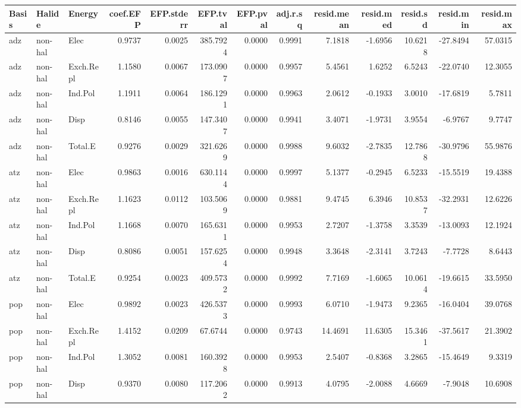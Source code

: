 \begin{table}[ht]
\centering
\scriptsize
\begin{tabular}{lllrrrrrrrrrr}
  \hline
Basis & Halide & Energy & coef.EFP & EFP.stderr & EFP.tval & EFP.pval & adj.r.sq & resid.mean & resid.med & resid.sd & resid.min & resid.max \\ 
  \hline
adz & non-hal & Elec & 0.9737 & 0.0025 & 385.7924 & 0.0000 & 0.9991 & 7.1818 & -1.6956 & 10.6218 & -27.8494 & 57.0315 \\ 
  adz & non-hal & Exch.Repl & 1.1580 & 0.0067 & 173.0907 & 0.0000 & 0.9957 & 5.4561 & 1.6252 & 6.5243 & -22.0740 & 12.3055 \\ 
  adz & non-hal & Ind.Pol & 1.1911 & 0.0064 & 186.1291 & 0.0000 & 0.9963 & 2.0612 & -0.1933 & 3.0010 & -17.6819 & 5.7811 \\ 
  adz & non-hal & Disp & 0.8146 & 0.0055 & 147.3407 & 0.0000 & 0.9941 & 3.4071 & -1.9731 & 3.9554 & -6.9767 & 9.7747 \\ 
  adz & non-hal & Total.E & 0.9276 & 0.0029 & 321.6269 & 0.0000 & 0.9988 & 9.6032 & -2.7835 & 12.7868 & -30.9796 & 55.9876 \\ 
  atz & non-hal & Elec & 0.9863 & 0.0016 & 630.1144 & 0.0000 & 0.9997 & 5.1377 & -0.2945 & 6.5233 & -15.5519 & 19.4388 \\ 
  atz & non-hal & Exch.Repl & 1.1623 & 0.0112 & 103.5069 & 0.0000 & 0.9881 & 9.4745 & 6.3946 & 10.8537 & -32.2931 & 12.6226 \\ 
  atz & non-hal & Ind.Pol & 1.1668 & 0.0070 & 165.6311 & 0.0000 & 0.9953 & 2.7207 & -1.3758 & 3.3539 & -13.0093 & 12.1924 \\ 
  atz & non-hal & Disp & 0.8086 & 0.0051 & 157.6254 & 0.0000 & 0.9948 & 3.3648 & -2.3141 & 3.7243 & -7.7728 & 8.6443 \\ 
  atz & non-hal & Total.E & 0.9254 & 0.0023 & 409.5732 & 0.0000 & 0.9992 & 7.7169 & -1.6065 & 10.0614 & -19.6615 & 33.5950 \\ 
  pop & non-hal & Elec & 0.9892 & 0.0023 & 426.5373 & 0.0000 & 0.9993 & 6.0710 & -1.9473 & 9.2365 & -16.0404 & 39.0768 \\ 
  pop & non-hal & Exch.Repl & 1.4152 & 0.0209 & 67.6744 & 0.0000 & 0.9743 & 14.4691 & 11.6305 & 15.3461 & -37.5617 & 21.3902 \\ 
  pop & non-hal & Ind.Pol & 1.3052 & 0.0081 & 160.3928 & 0.0000 & 0.9953 & 2.5407 & -0.8368 & 3.2865 & -15.4649 & 9.3319 \\ 
  pop & non-hal & Disp & 0.9370 & 0.0080 & 117.2062 & 0.0000 & 0.9913 & 4.0795 & -2.0088 & 4.6669 & -7.9048 & 10.6908 \\ 

\end{tabular}
\end{table}
